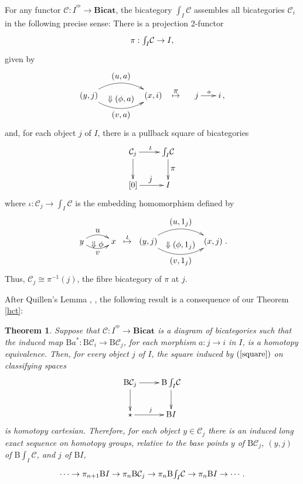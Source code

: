 \documentclass[]{amsart}
\newtheorem{theorem}{Theorem}[section]
\begin{document}
For any functor ${\ensuremath{\mathcal{C}}}: I^{^\mathrm {op}} \to {\ensuremath{\mathbf{Bicat}}} $, the bicategory $\int_I\!{\ensuremath{\mathcal{C}}}$ assembles all
bicategories ${\ensuremath{\mathcal{C}}}_i$ in the following precise sense: There is a projection 2-functor
$$
\xymatrix{\pi :\int_I\!{\ensuremath{\mathcal{C}}} \to I,}
$$
given by
$$\xymatrix@C=6pt{(y,j)  \ar@/^1.3pc/[rr]^{\textstyle (u,a)} \ar@/_1.3pc/[rr]_{\textstyle (v,a)} & {}_{\textstyle \Downarrow(\phi,a)} &(x,i)&\overset{\textstyle \pi}\mapsto\underset{~}~& j\ar[rr]^{a}&&i \,,}  $$
and, for each object $j$ of $I$, there is a pullback square of bicategories
\begin{equation}\label{square}
\xymatrix{{\ensuremath{\mathcal{C}}}_j\ar[r]^{\textstyle \iota}\ar[d]&\int_I\!{\ensuremath{\mathcal{C}}}\ar[d]^{\textstyle \pi}\\ [0]
\ar[r]^{\textstyle j}&I}
\end{equation}
where  $\iota:{\ensuremath{\mathcal{C}}}_j\to \int_I\!{\ensuremath{\mathcal{C}}}$ is the embedding homomorphism defined by
$$\xymatrix@C=3pt{y \ar@/^0.7pc/[rr]^{\textstyle u} \ar@/_0.7pc/[rr]_{\textstyle v} & {}_{\textstyle \Downarrow\phi} &x}\ \overset{\textstyle \iota}\mapsto  \
\xymatrix@C=4pt{(y,j)  \ar@/^1.3pc/[rr]^{\textstyle (u,1_j)} \ar@/_1.3pc/[rr]_{\textstyle (v,1_j)}
& {}_{\textstyle \Downarrow(\phi,1_j)} &(x,j)} .$$ Thus, ${\ensuremath{\mathcal{C}}}_j\cong \pi^{-1}(j)$, the fibre
bicategory of $\pi$ at $j$.

After Quillen's Lemma  \cite[pag. 90]{quillen}, \cite[\S IV, Lemma 5.7]{g-j}, the following result
is a consequence of our Theorem \ref{hct}:

\begin{theorem}\label{hc2} Suppose that ${\ensuremath{\mathcal{C}}}:I^{^{\mathrm{op}}}\to {\ensuremath{\mathbf{Bicat}}}$ is a diagram of bicategories such that the induced map
${\ensuremath{\mathrm{B}}} a^*:{\ensuremath{\mathrm{B}}} {\ensuremath{\mathcal{C}}}_{i}\to {\ensuremath{\mathrm{B}}} {\ensuremath{\mathcal{C}}}_{j}$, for each morphism $a:j\to i$ in  $I$,  is a homotopy
equivalence. Then, for every object $j$ of $I$, the square induced by $(\ref{square})$ on
classifying spaces
$$
\xymatrix{{\ensuremath{\mathrm{B}}}{\ensuremath{\mathcal{C}}}_j\ar[r]\ar[d]&{\ensuremath{\mathrm{B}}} \int_I\!{\ensuremath{\mathcal{C}}}\ar[d]\\ \star \ar[r]^j&{\ensuremath{\mathrm{B}}} I}
$$
is homotopy cartesian. Therefore, for each object $y\in {\ensuremath{\mathcal{C}}}_j$  there is an induced long exact
sequence on homotopy groups, relative to the base points $y$ of ${\ensuremath{\mathrm{B}}}{\ensuremath{\mathcal{C}}}_j$, $(y,j)$ of ${\ensuremath{\mathrm{B}}}
\!\int_I\!{\ensuremath{\mathcal{C}}}$, and $j$ of ${\ensuremath{\mathrm{B}}} I$,
$$\xymatrix{\cdots \to \pi_{n+1}{\ensuremath{\mathrm{B}}} I\to\pi_n{\ensuremath{\mathrm{B}}}{\ensuremath{\mathcal{C}}}_j\to\pi_n{\ensuremath{\mathrm{B}}} \!\int_I\!{\ensuremath{\mathcal{C}}}\to\pi_n{\ensuremath{\mathrm{B}}} I\to\cdots.}$$
\end{theorem}
\end{document}
